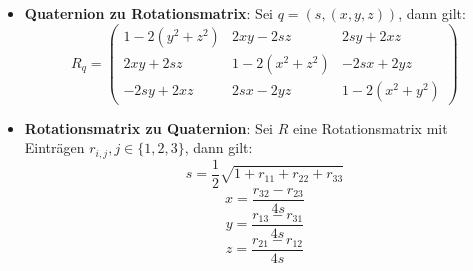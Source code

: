 \begin{itemize}
\begin{itemize}
	\end{itemize}
	\item \textbf{Quaternion zu Rotationsmatrix}: Sei $q = (s, (x, y, z))$, dann gilt:
	$$R_q = \begin{pmatrix}
		1 - 2(y^2 + z^2) & 2xy - 2sz & 2sy + 2xz\\
		2xy + 2sz & 1 - 2(x^2 + z^2) & -2sx + 2yz\\
		-2sy + 2xz & 2sx - 2yz & 1 - 2(x^2 + y^2)
	\end{pmatrix}$$
	\item \textbf{Rotationsmatrix zu Quaternion}: Sei $R$ eine Rotationsmatrix mit Einträgen $r_{i,j}, j \in \{1, 2, 3\}$, dann gilt:
	$$s = \frac{1}{2}\sqrt{1 + r_{11} + r_{22} + r_{33}}$$
	$$x = \frac{r_{32} - r_{23}}{4s}$$
	$$y = \frac{r_{13} - r_{31}}{4s}$$
	$$z = \frac{r_{21} - r_{12}}{4s}$$
\end{itemize}